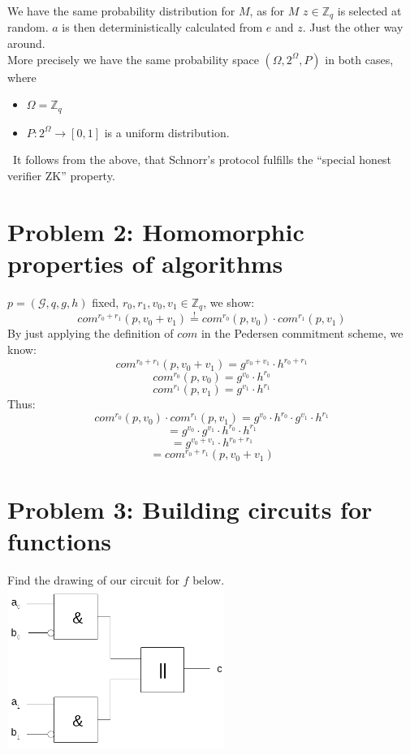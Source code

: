 \documentclass[12pt,pdftex,a4paper]{article}
\begin{document}
We have the same probability distribution for $M$, as for $M$ $z\in \mathbb{Z}_q$ is selected at random. $a$ is then deterministically calculated from $e$ and $z$. Just the other way around.\\
More precisely we have the same probability space $(\Omega, 2^{\Omega}, P)$ in both cases, where
\begin{itemize}
\item $\Omega = \mathbb{Z}_q$
\item $P: 2^{\Omega} \rightarrow [0,1]$ is a uniform distribution.
\end{itemize}\
It follows from the above, that Schnorr's protocol fulfills the ``special honest verifier ZK'' property.

\section*{Problem 2: Homomorphic properties of algorithms}
$p=(\mathcal{G},q,g,h)$ fixed, $r_0, r_1, v_0, v_1 \in \mathbb{Z}_q$, we show:
$$com^{r_0+r_1}(p, v_0 + v_1) \overset{!}{=} com^{r_0}(p, v_0) \cdot com^{r_1}(p, v_1)$$
By just applying the definition of $com$ in the Pedersen commitment scheme, we know:
$$com^{r_0+r_1}(p, v_0 + v_1) = g^{v_0 + v_1}\cdot h^{r_0+r_1}$$
$$com^{r_0}(p, v_0) = g^{v_0} \cdot h^{r_0}$$
$$com^{r_1}(p, v_1) = g^{v_1} \cdot h^{r_1}$$
Thus:
$$com^{r_0}(p, v_0) \cdot com^{r_1}(p, v_1) = g^{v_0} \cdot h^{r_0} \cdot g^{v_1} \cdot h^{r_1}$$
$$= g^{v_0}\cdot g^{v_1}\cdot h^{r_0}\cdot h^{r_1}$$
$$= g^{v_0 + v_1}\cdot h^{r_0+r_1}$$
$$= com^{r_0+r_1}(p, v_0 + v_1)$$


\section*{Problem 3: Building circuits for functions}
Find the drawing of our circuit for $f$ below.\\
\includegraphics[width=200pt]{./problem3_binary_circuit.png}
\end{document}
